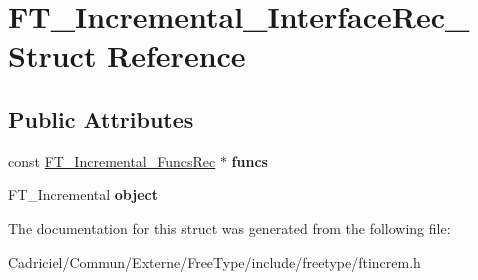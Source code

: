 \hypertarget{struct_f_t___incremental___interface_rec__}{\section{F\-T\-\_\-\-Incremental\-\_\-\-Interface\-Rec\-\_\- Struct Reference}
\label{struct_f_t___incremental___interface_rec__}
}
\subsection*{Public Attributes}
\begin{DoxyCompactItemize}
\item 
\hypertarget{struct_f_t___incremental___interface_rec___acd254ae2bdd80b4c9218a484c6bc2a41}{const \hyperlink{struct_f_t___incremental___funcs_rec__}{F\-T\-\_\-\-Incremental\-\_\-\-Funcs\-Rec} $\ast$ {\bfseries funcs}}\label{struct_f_t___incremental___interface_rec___acd254ae2bdd80b4c9218a484c6bc2a41}

\item 
\hypertarget{struct_f_t___incremental___interface_rec___ae4f527f53465ff84ad01b484fe721a88}{F\-T\-\_\-\-Incremental {\bfseries object}}\label{struct_f_t___incremental___interface_rec___ae4f527f53465ff84ad01b484fe721a88}

\end{DoxyCompactItemize}


The documentation for this struct was generated from the following file\-:\begin{DoxyCompactItemize}
\item 
Cadriciel/\-Commun/\-Externe/\-Free\-Type/include/freetype/ftincrem.\-h\end{DoxyCompactItemize}
